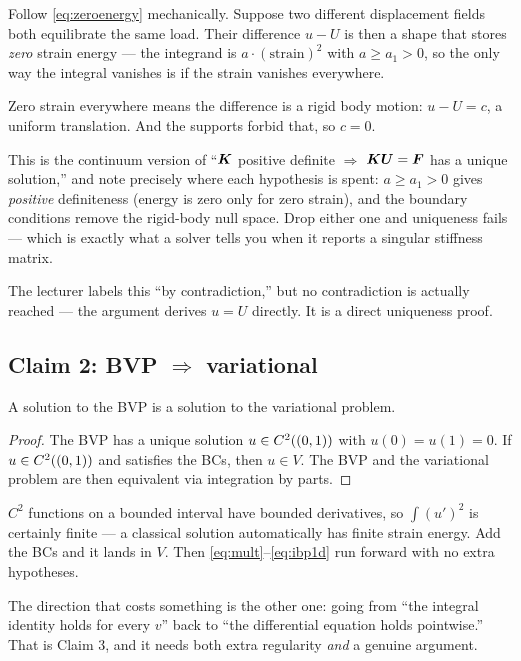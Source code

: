 \begin{intuition}
Follow \eqref{eq:zeroenergy} mechanically. Suppose two different displacement
fields both equilibrate the same load. Their difference $u-U$ is then a shape
that stores \emph{zero} strain energy --- the integrand is
$a\cdot(\text{strain})^{2}$ with $a\ge a_{1}>0$, so the only way the integral
vanishes is if the strain vanishes everywhere.

Zero strain everywhere means the difference is a rigid body motion: $u-U=c$, a
uniform translation. And the supports forbid that, so $c=0$.

This is the continuum version of ``$\Kmat$ positive definite $\Rightarrow$
$\Kmat\bm{U}=\bm{F}$ has a unique solution,'' and note precisely where each
hypothesis is spent: $a\ge a_{1}>0$ gives \emph{positive} definiteness (energy
is zero only for zero strain), and the boundary conditions remove the
rigid-body null space. Drop either one and uniqueness fails --- which is exactly
what a solver tells you when it reports a singular stiffness matrix.
\end{intuition}

\begin{remark}
The lecturer labels this ``by contradiction,'' but no contradiction is actually
reached --- the argument derives $u=U$ directly. It is a direct uniqueness
proof.
\end{remark}

\subsection*{Claim 2: BVP $\Rightarrow$ variational}

\begin{proposition}
A solution to the BVP is a solution to the variational problem.
\end{proposition}

\begin{proof}
The BVP has a unique solution $u\in\Ck[(0,1)]{2}$ with $u(0)=u(1)=0$.
If $u\in\Ck[(0,1)]{2}$ and satisfies the BCs, then $u\in V$. The BVP and the
variational problem are then equivalent via integration by parts.
\end{proof}

\begin{intuition}
$C^{2}$ functions on a bounded interval have bounded derivatives, so
$\int (u')^{2}$ is certainly finite --- a classical solution automatically has
finite strain energy. Add the BCs and it lands in $V$. Then
\eqref{eq:mult}--\eqref{eq:ibp1d} run forward with no extra hypotheses.

The direction that costs something is the other one: going from ``the integral
identity holds for every $v$'' back to ``the differential equation holds
pointwise.'' That is Claim 3, and it needs both extra regularity \emph{and} a
genuine argument.
\end{intuition}

